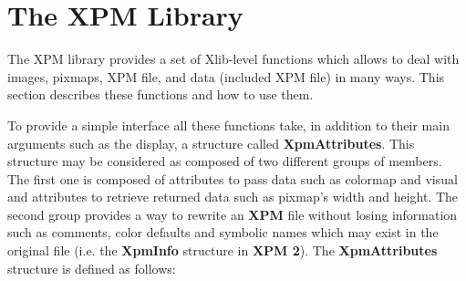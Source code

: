 \newpage
\section{The {\bf XPM} Library}

The XPM library provides a set of Xlib-level functions which allows to deal
with images, pixmaps, XPM file, and data (included XPM file) in many ways.
This section describes these functions and how to use them.

\vspace{.5cm}
To provide a simple interface all these functions take, in addition to their
main arguments such as the display, a structure called {\bf XpmAttributes}.
This structure may be considered as composed of two different groups of
members. The first one is composed of attributes to pass data such as colormap
and visual and attributes to retrieve returned data such as pixmap's width and
height. The second group provides a way to rewrite an {\bf XPM} file without
losing information such as comments, color defaults and symbolic names which
may exist in the original file (i.e. the {\bf XpmInfo} structure in {\bf XPM 2}).
The {\bf XpmAttributes} structure is defined as follows:

